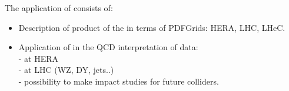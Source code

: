 The application of \fitter consists of:
\begin{itemize}
\item
Description of product of the \fitter in terms of PDFGrids: HERA, LHC, LHeC.
\item
Application of \fitter in the QCD interpretation of data: \\
- at HERA  \\
- at LHC (WZ, DY, jets..)  \\
- possibility to make impact studies for future colliders.
\end{itemize}
